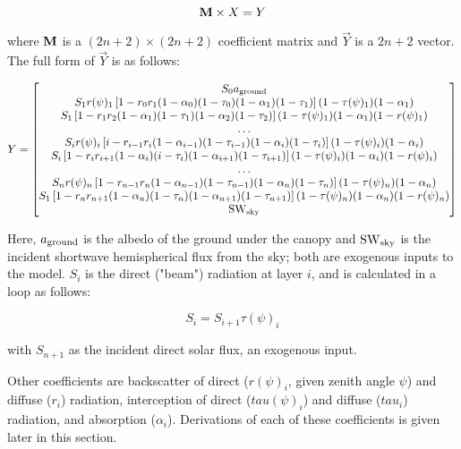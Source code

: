 \begin{equation}
  \mathbf{M} \times \relax{X} = \relax{Y}
\end{equation}

where $\mathbf{M}$ is a $(2n + 2) \times (2n + 2)$ coefficient matrix and $\vec{Y}$ is a $2n + 2$ vector.
The full form of $\vec{Y}$ is as follows:

\begin{equation}
  \relax{Y} =
  \begin{bmatrix}
    S_0 a_{\mathrm{ground}} \\
    S_1 r(\psi)_1 \left[ 1 - r_0 r_1 (1 - \alpha_0) (1 - \tau_0) (1 - \alpha_1) (1 - \tau_1) \right] (1 - \tau(\psi)_1) (1 - \alpha_1) \\
    S_1 \left[ 1 - r_1 r_2 (1 - \alpha_1) (1 - \tau_1) (1 - \alpha_2) (1 - \tau_2) \right] (1 - \tau(\psi)_1) (1 - \alpha_1) (1 - r(\psi)_1) \\
    \ldots \\
    S_i r(\psi)_i \left[ i - r_{i-1} r_i (1 - \alpha_{i-1}) (1 - \tau_{i-1}) (1 - \alpha_i) (1 - \tau_i) \right] (1 - \tau(\psi)_i) (1 - \alpha_i) \\
    S_i \left[ 1 - r_i r_{i+1} (1 - \alpha_i) (i - \tau_i) (1 - \alpha_{i+1}) (1 - \tau_{i+1}) \right] (1 - \tau(\psi)_i) (1 - \alpha_i) (1 - r(\psi)_i) \\
    \ldots \\
    S_n r(\psi)_n \left[ 1 - r_{n-1} r_n (1 - \alpha_{n-1}) (1 - \tau_{n-1}) (1 - \alpha_n) (1 - \tau_n) \right] (1 - \tau(\psi)_n) (1 - \alpha_n) \\
    S_1 \left[ 1 - r_n r_{n+1} (1 - \alpha_n) (1 - \tau_n) (1 - \alpha_{n+1}) (1 - \tau_{n+1}) \right] (1 - \tau(\psi)_n) (1 - \alpha_n) (1 - r(\psi)_n) \\
    \mathrm{SW}_{\mathrm{sky}}
  \end{bmatrix}
\end{equation}

Here, $a_{\mathrm{ground}}$ is the albedo of the ground under the canopy and $\mathrm{SW}_{\mathrm{sky}}$ is the incident shortwave hemispherical flux from the sky;
both are exogenous inputs to the model.
$S_i$ is the direct ("beam") radiation at layer $i$, and is calculated in a loop as follows:

\begin{equation}
  S_i = S_{i + 1} \tau(\psi)_i
\end{equation}

with $S_{n+1}$ as the incident direct solar flux, an exogenous input.

Other coefficients are
backscatter of direct ($r(\psi)_{i}$, given zenith angle $\psi$) and diffuse ($r_{i}$) radiation,
interception of direct ($tau(\psi)_{i}$) and diffuse ($tau_{i}$) radiation,
and absorption ($\alpha_{i}$).
Derivations of each of these coefficients is given later in this section.

